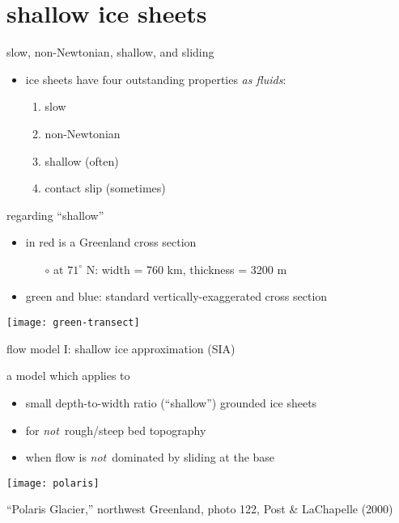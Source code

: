 
\section{shallow ice sheets}

\begin{frame}{slow, non-Newtonian, shallow, and sliding}

\begin{itemize}
\item ice sheets have four outstanding properties \emph{as fluids}:
  \begin{enumerate}
  \item slow
  \item non-Newtonian
  \item shallow (often)
  \item contact slip (sometimes)
  \end{enumerate}
\end{itemize}
\end{frame}


\begin{frame}{regarding ``shallow''}

\begin{itemize}
\item in \alert{red} is a Greenland cross section
  \begin{itemize}
  \item[$\circ$] at $71^\circ$ N: \qquad width = 760 km, thickness = 3200 m
  \end{itemize}
\item green and blue: standard vertically-exaggerated cross section
\end{itemize}

\begin{center}
  \texttt{[image: green-transect]}
\end{center}
\end{frame}


\begin{frame}{flow model I: shallow ice approximation (SIA)}

a model which applies to
\begin{itemize}
\item small depth-to-width ratio (``shallow'') grounded ice sheets
\item for \emph{not}\, rough/steep bed topography
\item when flow is \emph{not}\, dominated by sliding at the base
\end{itemize}

\begin{center}
  \texttt{[image: polaris]}

\tiny ``Polaris Glacier,'' northwest Greenland, photo 122, Post \& LaChapelle (2000)
\end{center}

\end{frame}


